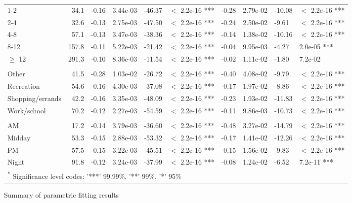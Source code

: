 \documentclass{article}\usepackage[utf8]{inputenc}
\begin{document}
\begin{table}[H]
\begin{tabular}{lrllllllll}
\hspace{1em}1-2 & 34.1 & -0.16 & 3.44e-03 & -46.37 & $<$ 2.2e-16 *** & -0.28 & 2.79e-02 & -10.08 & $<$ 2.2e-16 ***\\
\hspace{1em}2-4 & 32.6 & -0.13 & 2.75e-03 & -47.50 & $<$ 2.2e-16 *** & -0.24 & 2.50e-02 & -9.61 & $<$ 2.2e-16 ***\\
\hspace{1em}4-8 & 57.1 & -0.13 & 3.47e-03 & -38.36 & $<$ 2.2e-16 *** & -0.14 & 1.38e-02 & -10.16 & $<$ 2.2e-16 ***\\
\hspace{1em}8-12 & 157.8 & -0.11 & 5.22e-03 & -21.42 & $<$ 2.2e-16 *** & -0.04 & 9.95e-03 & -4.27 & 2.0e-05 ***\\
\hspace{1em}$\geq$ 12 & 291.3 & -0.10 & 8.36e-03 & -11.54 & $<$ 2.2e-16 *** & -0.02 & 1.11e-02 & -1.80 & 7.2e-02\\
\addlinespace[0.3em]
\multicolumn{10}{l}{\textbf{Trip purpose model, $McFadden~R^2 = 0.55$}}\\
\hline
\hspace{1em}Other & 41.5 & -0.28 & 1.03e-02 & -26.72 & $<$ 2.2e-16 *** & -0.40 & 4.08e-02 & -9.79 & $<$ 2.2e-16 ***\\
\hspace{1em}Recreation & 54.6 & -0.16 & 4.30e-03 & -37.08 & $<$ 2.2e-16 *** & -0.17 & 1.97e-02 & -8.86 & $<$ 2.2e-16 ***\\
\hspace{1em}Shopping/errands & 42.2 & -0.16 & 3.35e-03 & -48.09 & $<$ 2.2e-16 *** & -0.23 & 1.93e-02 & -11.83 & $<$ 2.2e-16 ***\\
\hspace{1em}Work/school & 70.2 & -0.12 & 2.27e-03 & -54.59 & $<$ 2.2e-16 *** & -0.11 & 9.86e-03 & -10.73 & $<$ 2.2e-16 ***\\
\addlinespace[0.3em]
\multicolumn{10}{l}{\textbf{Time-of-day model, $McFadden~R^2 = 0.53$}}\\
\hline
\hspace{1em}AM & 17.2 & -0.14 & 3.79e-03 & -36.60 & $<$ 2.2e-16 *** & -0.48 & 3.27e-02 & -14.79 & $<$ 2.2e-16 ***\\
\hspace{1em}Midday & 53.3 & -0.15 & 2.88e-03 & -53.32 & $<$ 2.2e-16 *** & -0.17 & 1.41e-02 & -12.26 & $<$ 2.2e-16 ***\\
\hspace{1em}PM & 57.5 & -0.15 & 3.22e-03 & -45.51 & $<$ 2.2e-16 *** & -0.15 & 1.56e-02 & -9.83 & $<$ 2.2e-16 ***\\
\hspace{1em}Night & 91.8 & -0.12 & 3.24e-03 & -37.99 & $<$ 2.2e-16 *** & -0.08 & 1.24e-02 & -6.52 & 7.2e-11 ***\\
\bottomrule
\multicolumn{10}{l}{\textsuperscript{*} Significance level codes: '***' 99.99\%, '**' 99\%, '*' 95\%}\\
\end{tabular}
\endgroup{} \end{table} \begin{table}[H]\centering\caption{Summary of parametric fitting results} \begingroup\fontsize{9}{11}\selectfont


\end{table}
\end{document}
